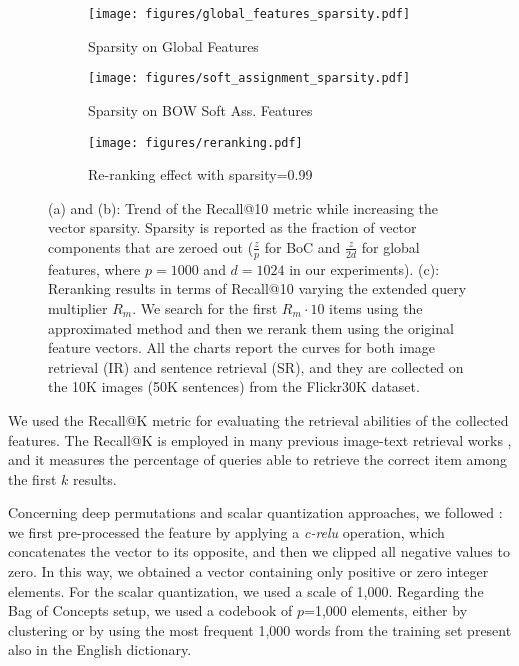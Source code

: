 \documentclass[conference]{IEEEtran}
\begin{document}
\begin{figure*}[t]
\begin{subfigure}[b]{0.3\textwidth}
\centering
\texttt{[image: figures/global\_features\_sparsity.pdf]}
\caption{Sparsity on Global Features}
\label{fig:sparsify_global}
\end{subfigure}
\begin{subfigure}[b]{0.3\textwidth}
\centering
\texttt{[image: figures/soft\_assignment\_sparsity.pdf]}
\caption{Sparsity on BOW Soft Ass. Features}
\label{fig:sparsify_soft_assignment}
\end{subfigure}
\begin{subfigure}[b]{0.4\textwidth}
\centering
\texttt{[image: figures/reranking.pdf]}
\caption{Re-ranking effect with sparsity=0.99}
\label{fig:reranking} 
\end{subfigure}

\caption{(a) and (b): Trend of the Recall@10 metric while increasing the vector sparsity. Sparsity is reported as the fraction of vector components that are zeroed out ($\frac{z}{p}$ for BoC and $\frac{z}{2d}$ for global features, where $p=1000$ and $d=1024$ in our experiments). %
(c): Reranking results in terms of Recall@10 varying the extended query multiplier $R_m$. We search for the first $R_m \cdot 10$ items using the approximated method and then we rerank them using the original feature vectors. All the charts report the curves for both image retrieval (IR) and sentence retrieval (SR), and they are collected on the 10K images (50K sentences) from the Flickr30K dataset.}
\label{fig:sparsity}       %
\end{figure*}

We used the Recall@K metric for evaluating the retrieval abilities of the collected features. The Recall@K is employed in many previous image-text retrieval works \cite{vsepp2018faghri,li2019,messina2020transformer}, and it measures the percentage of queries able to retrieve the correct item among the first $k$ results.

Concerning deep permutations and scalar quantization approaches, we followed \cite{amato2019large}: we first pre-processed the feature by applying a \textit{c-relu} operation, which concatenates the vector to its opposite, and then we clipped all negative values to zero. In this way, we obtained a vector containing only positive or zero integer elements. For the scalar quantization, we used a scale of 1,000.
Regarding the Bag of Concepts setup, we used a codebook of $p$=1,000 elements, either by clustering or by using the most frequent 1,000 words from the training set present also in the English dictionary. 
\end{document}
